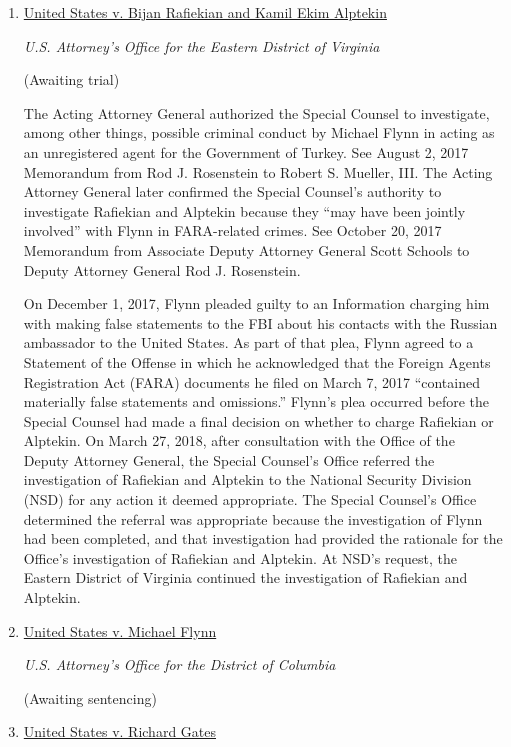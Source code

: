 \begin{enumerate}[1.]

\item \underline{United States v. Bijan Rafiekian and Kamil Ekim Alptekin}

\textit{U.S. Attorney’s Office for the Eastern District of Virginia}

(Awaiting trial)

The Acting Attorney General authorized the Special Counsel to investigate, among other things, possible criminal conduct by Michael Flynn in acting as an unregistered agent for the Government of Turkey.
See August 2, 2017 Memorandum from Rod J. Rosenstein to Robert S. Mueller, III.
The Acting Attorney General later confirmed the Special Counsel’s authority to investigate Rafiekian and Alptekin because they “may have been jointly involved” with Flynn in FARA-related crimes.
See October 20, 2017 Memorandum from Associate Deputy Attorney General Scott Schools to Deputy Attorney General Rod J. Rosenstein.

On December 1, 2017, Flynn pleaded guilty to an Information charging him with making false statements to the FBI about his contacts with the Russian ambassador to the United States.
As part of that plea, Flynn agreed to a Statement of the Offense in which he acknowledged that the Foreign Agents Registration Act (FARA) documents he filed on March 7, 2017 “contained materially false statements and omissions.”
Flynn’s plea occurred before the Special Counsel had made a final decision on whether to charge Rafiekian or Alptekin.
On March 27, 2018, after consultation with the Office of the Deputy Attorney General, the Special Counsel’s Office referred the investigation of Rafiekian and Alptekin to the National Security Division (NSD) for any action it deemed appropriate.
The Special Counsel’s Office determined the referral was appropriate because the investigation of Flynn had been completed, and that investigation had provided the rationale for the Office’s investigation of Rafiekian and Alptekin.
At NSD’s request, the Eastern District of Virginia continued the investigation of Rafiekian and Alptekin.

    \item \underline{United States v. Michael Flynn}

\textit{U.S. Attorney’s Office for the District of Columbia}

(Awaiting sentencing)

    \item \underline{United States v. Richard Gates}


\end{enumerate}
